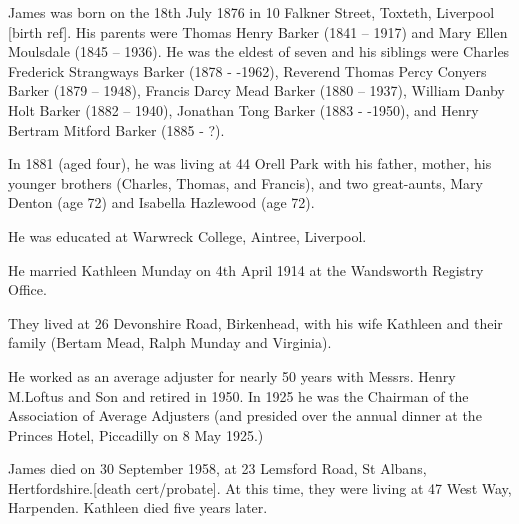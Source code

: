 
James was born on the 18th July 1876 in 10 Falkner Street, Toxteth, Liverpool [birth ref]. His parents were  Thomas Henry Barker (1841 -- 1917) and Mary Ellen Moulsdale (1845 -- 1936). He was the eldest of seven and his siblings were Charles Frederick Strangways Barker (1878 - -1962),  Reverend Thomas Percy Conyers Barker (1879 -- 1948), Francis Darcy Mead Barker (1880 -- 1937), William Danby Holt Barker (1882 -- 1940), Jonathan Tong Barker (1883 - -1950), and Henry Bertram Mitford Barker (1885 - ?).  

In 1881 (aged four), he was living at 44 Orell Park with his father, mother, his younger brothers (Charles, Thomas, and Francis), and two great-aunts, Mary Denton (age 72) and Isabella Hazlewood (age 72).\cite{UKCensusRG11_3688}

He was educated at Warwreck College, Aintree, Liverpool.

He married Kathleen Munday on 4th April 1914 at the Wandsworth Registry Office.

They lived at 26 Devonshire Road, Birkenhead, with his wife Kathleen and their family (Bertam Mead, Ralph Munday and Virginia).

He worked as an average adjuster for nearly 50 years with Messrs. Henry M.Loftus and Son and retired in 1950. In 1925 he was the Chairman of the Association of Average Adjusters (and presided over the annual dinner at the Princes Hotel, Piccadilly on 8 May 1925.)

James died on 30 September 1958, at 23 Lemsford Road, St Albans, Hertfordshire.[death cert/probate]. At this time, they were living at 47 West Way, Harpenden. Kathleen died five years later.




